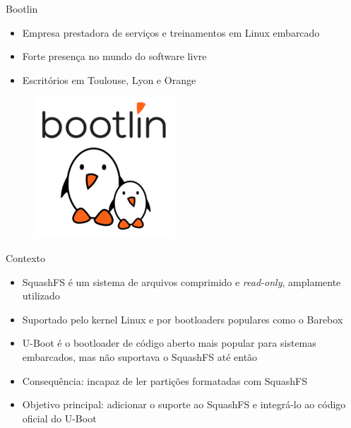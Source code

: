 \begin{frame}{Bootlin}
    \begin{itemize}
        \item Empresa prestadora de serviços e treinamentos em Linux embarcado
        \item Forte presença no mundo do software livre
        \item Escritórios em Toulouse, Lyon e Orange
    \end{itemize}
    
    \begin{figure}
        \centering
        \includegraphics[scale=0.6]{figuras/bootlin_logo.png}
        \label{fig:my_label}
    \end{figure}
\end{frame}


\begin{frame}{Contexto}
\begin{itemize}
    \item SquashFS é um sistema de arquivos comprimido e \textit{read-only}, amplamente utilizado
    \item Suportado pelo kernel Linux e por bootloaders populares como o Barebox
    \item U-Boot é o bootloader de código aberto mais popular para sistemas embarcados, mas não suportava o SquashFS até então
    \item Consequência: incapaz de ler partições formatadas com SquashFS
    \item Objetivo principal: adicionar o suporte ao SquashFS e integrá-lo ao código oficial do U-Boot
\end{itemize}
\end{frame}

